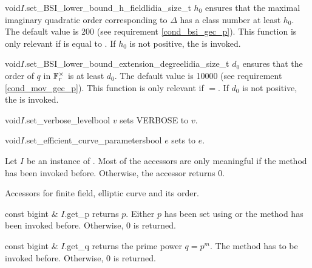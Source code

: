 \begin{fcode}{void}{$I$.set_BSI_lower_bound_h_field}{lidia_size_t $h_0$}
  ensures that the maximal imaginary quadratic order corresponding to $\Delta$
  has a class number at least $h_0.$ The default value
  is 200 (see requirement \ref{cond_bsi_gec_p}). This function is only relevant
  if  is equal to . If $h_0$
  is not positive, the
   is invoked.
\end{fcode}

\begin{fcode}{void}{$I$.set_BSI_lower_bound_extension_degree}{lidia_size_t $d_0$}
  ensures that the order of $q$ in $\mathbb{F}_r^\times$ is at least $d_0.$
  The default value is 10000 (see requirement \ref{cond_mov_gec_p}).
  This function is only relevant if
  $=$. If $d_0$
  is not positive, the
   is invoked.
\end{fcode}

\begin{fcode}{void}{$I$.set_verbose_level}{bool $v$}
  sets VERBOSE to $v.$
\end{fcode}

\begin{fcode}{void}{$I$.set_efficient_curve_parameters}{bool $e$}
  sets  to $e.$
\end{fcode}




\ACCS

Let $I$ be an instance of .
Most of the accessors are only meaningful if the
method  has been invoked before. Otherwise,
the accessor returns 0.

Accessors for finite field, elliptic curve and its order.

\begin{cfcode}{const bigint & }{$I$.get_p}{} 
  returns $p.$ Either $p$ has been set using 
  or the method  has been invoked before. Otherwise,
  0 is returned.
\end{cfcode}

\begin{cfcode}{const bigint & }{$I$.get_q}{} 
  returns the prime power $q=p^m.$ 
  The method  has to be invoked before. Otherwise,
  0 is returned.
\end{cfcode}

